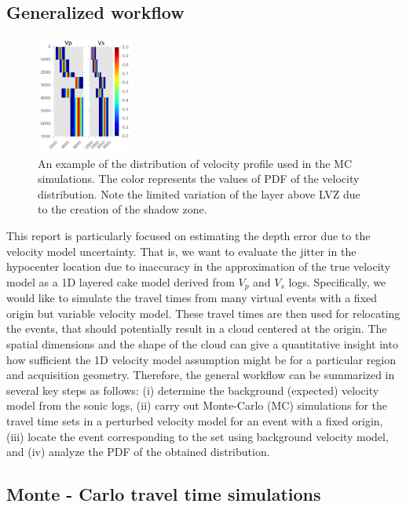 \documentclass[letterpaper,11pt]{article}
\begin{document}
\subsection*{Generalized workflow}
\begin{figure}
\vspace{-4mm}
\centering
\includegraphics[width=0.28\textwidth]{./AntonBiryukov_bibtex/VpVs.png}
\vspace{-4mm}
\caption{An example of the distribution of velocity profile used in the MC simulations. The color represents the values of PDF of the velocity distribution. Note the limited variation of the layer above \textsc{LVZ} due to the creation of the shadow zone.}
\label{fig:vpvs}
\end{figure}
This report is particularly focused on estimating the depth error due to the velocity model uncertainty. That is, we want to evaluate the jitter in the hypocenter location due to inaccuracy in the approximation of the true velocity model as a 1D layered cake model derived from $V_{p}$ and $V_{s}$ logs. Specifically, we would like to simulate the travel times from many virtual events with a fixed origin but variable velocity model. These travel times are then used for relocating the events, that should potentially result in a cloud centered at the origin. The spatial dimensions and the shape of the cloud can give a quantitative insight into how sufficient the 1D velocity model assumption might be for a particular region and acquisition geometry. Therefore, the general workflow can be summarized in several key steps as follows: (i) determine the background (expected) velocity model from the sonic logs, (ii) carry out Monte-Carlo (MC) simulations for the travel time sets in a perturbed velocity model for an event with a fixed origin, (iii) locate the event corresponding to the set using background velocity model,
and (iv) analyze the PDF of the obtained distribution.

\subsection*{Monte - Carlo travel time simulations}
\end{document}
